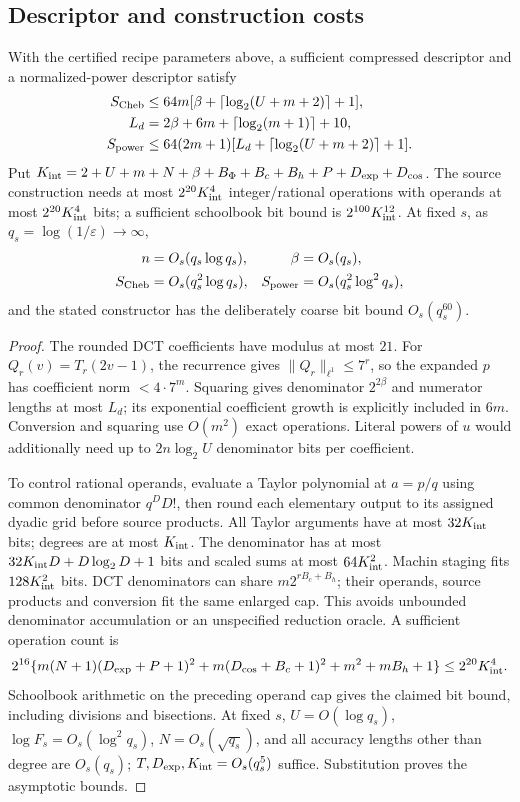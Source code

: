 \subsection{Descriptor and construction costs}
\begin{theorem}\label{thm:ac-construction}
With the certified recipe parameters above, a sufficient compressed
descriptor and a normalized-power descriptor satisfy
\begin{align}
 S_{\rm Cheb}&\le64m[\beta+\lceil\log_2(U+m+2)\rceil+1],\notag\\
 L_d&=2\beta+6m+\lceil\log_2(m+1)\rceil+10,\notag\\
 S_{\rm power}&\le64(2m+1)[L_d+\lceil\log_2(U+m+2)\rceil+1].
 \label{eq:ac-descriptors}
\end{align}
Put $K_{\rm int}=2+U+m+N+\beta+B_\Phi+B_c+B_h+P+D_{\exp}+D_{\cos}$.
The source construction needs at most $2^{20}K_{\rm int}^4$
integer/rational operations with operands at most
$2^{20}K_{\rm int}^4$ bits; a sufficient schoolbook bit bound is
$2^{100}K_{\rm int}^{12}$. At fixed $s$, as $q_s=\log(1/\varepsilon)
\to\infty$,
\begin{align}
 n&=O_s(q_s\log q_s),&\beta&=O_s(q_s),\notag\\
 S_{\rm Cheb}&=O_s(q_s^2\log q_s),&
 S_{\rm power}&=O_s(q_s^2\log^2q_s),
 \label{eq:ac-asymptotic-cost}
\end{align}
and the stated constructor has the deliberately coarse bit bound
$O_s(q_s^{60})$.
\end{theorem}
\begin{proof}
The rounded DCT coefficients have modulus at most $21$. For
$Q_r(v)=T_r(2v-1)$, the recurrence gives
$\|Q_r\|_{\ell^1}\le7^r$, so the expanded $p$ has coefficient
norm $<4\cdot7^m$. Squaring gives denominator $2^{2\beta}$ and
numerator lengths at most $L_d$; its exponential coefficient growth
is explicitly included in $6m$. Conversion and squaring use
$O(m^2)$ exact operations. Literal powers of $u$ would additionally
need up to $2n\log_2U$ denominator bits per coefficient.

To control rational operands, evaluate a Taylor polynomial at $a=p/q$
using common denominator $q^D D!$, then round each elementary output
to its assigned dyadic grid before source products. All Taylor arguments
have at most $32K_{\rm int}$ bits; degrees are at most $K_{\rm int}$.
The denominator has at most
$32K_{\rm int}D+D\log_2D+1$ bits and scaled sums at most
$64K_{\rm int}^2$. Machin staging fits $128K_{\rm int}^2$ bits.
DCT denominators can share $m2^{rB_c+B_h}$; their operands,
source products and conversion fit the same enlarged cap. This avoids
unbounded denominator accumulation or an unspecified reduction oracle.
A sufficient operation count is
\[
 2^{16}\{m(N+1)(D_{\exp}+P+1)^2
       +m(D_{\cos}+B_c+1)^2+m^2+mB_h+1\}
       \le2^{20}K_{\rm int}^4.
\]
Schoolbook arithmetic on the preceding operand cap gives the claimed
bit bound, including divisions and bisections. At fixed $s$,
$U=O(\log q_s)$, $\log F_s=O_s(\log^2q_s)$,
$N=O_s(\sqrt{q_s})$, and all accuracy lengths other than degree are
$O_s(q_s)$; $T,D_{\exp},K_{\rm int}=O_s(q_s^5)$ suffice.
Substitution proves the asymptotic bounds.
\end{proof}
